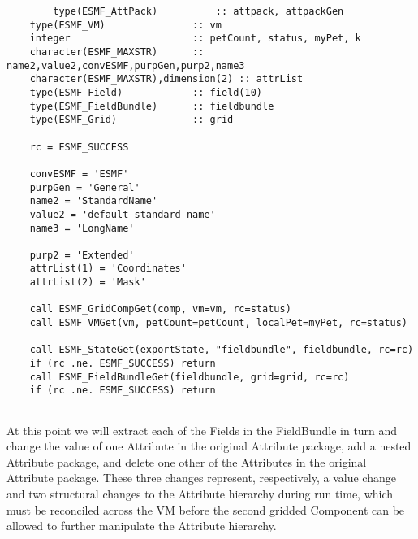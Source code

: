  \begin{verbatim}
        type(ESMF_AttPack)          :: attpack, attpackGen
    type(ESMF_VM)               :: vm
    integer                     :: petCount, status, myPet, k
    character(ESMF_MAXSTR)      :: name2,value2,convESMF,purpGen,purp2,name3
    character(ESMF_MAXSTR),dimension(2) :: attrList
    type(ESMF_Field)            :: field(10)
    type(ESMF_FieldBundle)      :: fieldbundle
    type(ESMF_Grid)             :: grid

    rc = ESMF_SUCCESS

    convESMF = 'ESMF'
    purpGen = 'General'
    name2 = 'StandardName'
    value2 = 'default_standard_name'
    name3 = 'LongName'

    purp2 = 'Extended'
    attrList(1) = 'Coordinates'
    attrList(2) = 'Mask'

    call ESMF_GridCompGet(comp, vm=vm, rc=status)
    call ESMF_VMGet(vm, petCount=petCount, localPet=myPet, rc=status)

    call ESMF_StateGet(exportState, "fieldbundle", fieldbundle, rc=rc)
    if (rc .ne. ESMF_SUCCESS) return
    call ESMF_FieldBundleGet(fieldbundle, grid=grid, rc=rc)
    if (rc .ne. ESMF_SUCCESS) return
 
\end{verbatim}
 

   At this point we will extract each of the Fields in the FieldBundle in turn
   and change the value of one Attribute in the original Attribute package,
   add a nested Attribute package, and delete one other of the Attributes in the
   original Attribute package.  These three changes represent, respectively, a
   value change and two structural changes to the Attribute hierarchy during
   run time, which must be reconciled across the VM before the second gridded
   Component can be allowed to further manipulate the Attribute hierarchy. 

